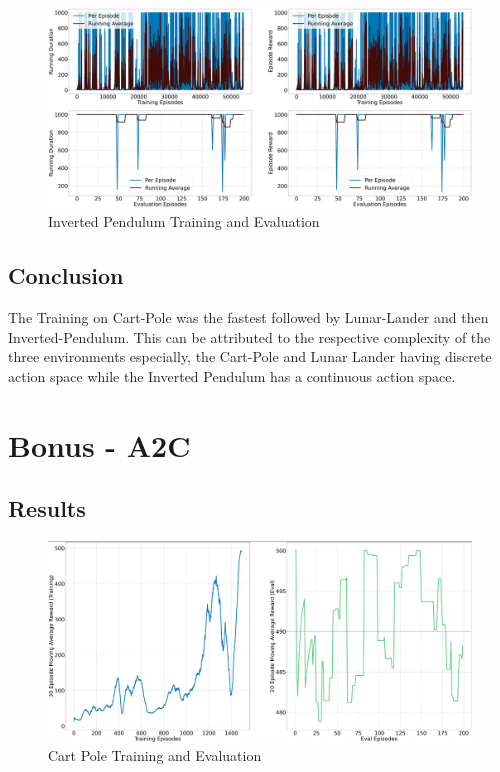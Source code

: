 \documentclass{article} %
\begin{document}
\begin{figure}[H]
    \begin{center}
        \includegraphics[width=\textwidth]{qac_invpendulum.png}
    \end{center}
    \caption{Inverted Pendulum Training and Evaluation}
\end{figure}

\subsection{Conclusion}
The Training on Cart-Pole was the fastest followed by Lunar-Lander and then Inverted-Pendulum. This can be attributed to the respective complexity of the three environments especially, the Cart-Pole and Lunar Lander having discrete action space while the Inverted Pendulum has a continuous action space.

\section{Bonus - A2C}
\subsection{Results}
\begin{figure}[H]
    \begin{center}
        \includegraphics[width=\textwidth]{a2c_cartpole.png}
    \end{center}
    \caption{Cart Pole Training and Evaluation}
\end{figure}
\end{document}
